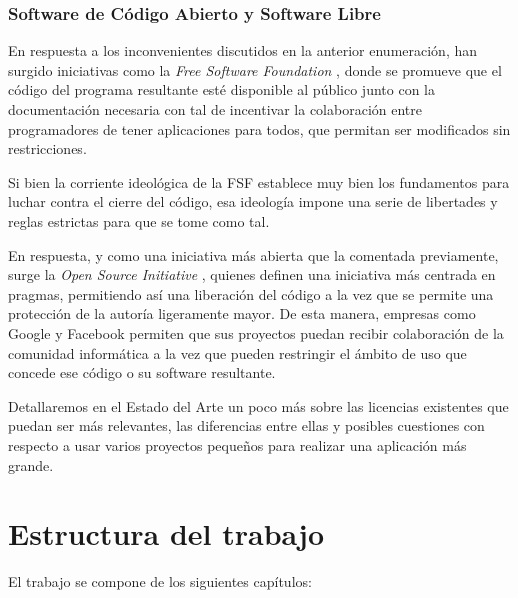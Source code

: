 
\subsubsection{Software de Código Abierto y Software Libre}

En respuesta a los inconvenientes discutidos en la anterior enumeración, han surgido iniciativas como la \textit{Free Software Foundation} \cite{fsf-about}, donde se promueve que el código del programa resultante esté disponible al público junto con la documentación necesaria con tal de incentivar la colaboración entre programadores de tener aplicaciones para todos, que permitan ser modificados sin restricciones.


Si bien la corriente ideológica de la FSF establece muy bien los fundamentos para luchar contra el cierre del código, esa ideología impone una serie de libertades y reglas estrictas para que se tome como tal. 

En respuesta, y como una iniciativa más abierta que la comentada previamente, surge la \textit{Open Source Initiative} \cite{osi-about}, quienes definen una iniciativa más centrada en pragmas, permitiendo así una liberación del código a la vez que se permite una protección de la autoría ligeramente mayor. De esta manera, empresas como Google y Facebook permiten que sus proyectos puedan recibir colaboración de la comunidad informática a la vez que pueden restringir el ámbito de uso que concede ese código o su software resultante.


Detallaremos en el Estado del Arte un poco más sobre las licencias existentes que puedan ser más relevantes, las diferencias entre ellas y posibles cuestiones con respecto a usar varios proyectos pequeños para realizar una aplicación más grande.

\section{Estructura del trabajo}

El trabajo se compone de los siguientes capítulos:

